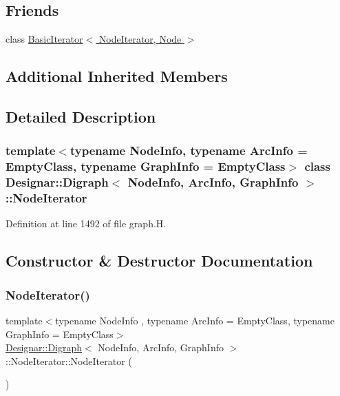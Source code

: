 \subsection*{Friends}
\begin{DoxyCompactItemize}
\item 
class \hyperlink{class_designar_1_1_digraph_1_1_node_iterator_a21dc6ae614d097ff896e9e8e422d8f3c}{Basic\+Iterator$<$ Node\+Iterator, Node $>$}
\end{DoxyCompactItemize}
\subsection*{Additional Inherited Members}


\subsection{Detailed Description}
\subsubsection*{template$<$typename Node\+Info, typename Arc\+Info = Empty\+Class, typename Graph\+Info = Empty\+Class$>$\newline
class Designar\+::\+Digraph$<$ Node\+Info, Arc\+Info, Graph\+Info $>$\+::\+Node\+Iterator}



Definition at line 1492 of file graph.\+H.



\subsection{Constructor \& Destructor Documentation}
\mbox{\label{class_designar_1_1_digraph_1_1_node_iterator_a53d6530188cf6c4ed6d2b2b114af9967}} 
\subsubsection{\texorpdfstring{Node\+Iterator()}{NodeIterator()}\hspace{0.1cm}{\footnotesize\ttfamily [1/5]}}
{\footnotesize\ttfamily template$<$typename Node\+Info , typename Arc\+Info  = Empty\+Class, typename Graph\+Info  = Empty\+Class$>$ \\
\hyperlink{class_designar_1_1_digraph}{Designar\+::\+Digraph}$<$ Node\+Info, Arc\+Info, Graph\+Info $>$\+::Node\+Iterator\+::\+Node\+Iterator (\begin{DoxyParamCaption}{ }\end{DoxyParamCaption})\hspace{0.3cm}{\ttfamily [inline]}}



